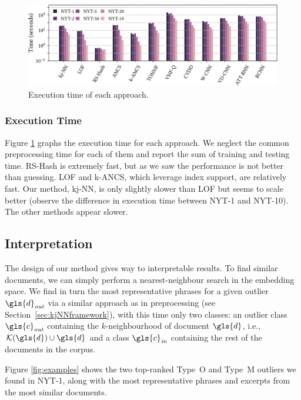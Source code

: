 \begin{figure}
	\includegraphics[width=\linewidth]{part4-figures/runtime-3-crop-compressed.pdf}
	\caption{Execution time of each approach.}
	\label{fig:runtime}
\end{figure} %

\subsubsection{Execution Time}
Figure \ref{fig:runtime} graphs the execution time for each approach. We neglect the common preprocessing time for each of them and report the sum of training and testing time. \gls{RS-Hash} is extremely fast, but as we saw the performance is not better than guessing. \gls{LOF} and \gls{k-ANCS}, which leverage index support, are relatively fast. 
Our method, \gls{kj-NN}, is only slightly slower than \gls{LOF} but seems to scale better (observe the difference in execution time between NYT-1 and NYT-10). The other methods appear slower. 

\subsection{Interpretation}

The design of our method gives way to interpretable results. To find similar documents, we can simply perform a nearest-neighbour search in the embedding space. We find in turn the most representative phrases for a given outlier $\gls{d}_{\textit{out}}$ via a similar approach as in preprocessing (see Section~\ref{sec:kjNNframework}), 
with this time only two classes: an outlier class $\gls{c}_{\textit{out}}$ containing the $k$-neighbourhood of document $\gls{d}$, i.e., $\mathcal{K}(\gls{d}) \cup  \gls{d}$ and a class $\gls{c}_{\textit{in}}$ containing the rest of the documents in the corpus. 

Figure \ref{fig:examples} shows the two top-ranked Type~O and Type~M outliers we found in NYT-1, along with the most representative phrases and excerpts from the most similar documents. 

